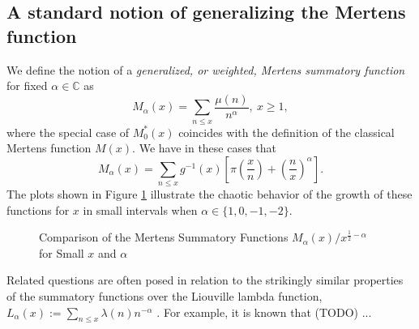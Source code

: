 \documentclass[11pt,reqno,a4letter]{article}
\numberwithin{figure}{section}
\numberwithin{table}{section}
\theoremstyle{plain}
\numberwithin{theorem}{section}
\theoremstyle{definition}
\begin{document}
\subsection{A standard notion of generalizing the Mertens function} 

We define the notion of a 
\emph{generalized, or weighted, Mertens summatory function} for fixed 
$\alpha \in \mathbb{C}$ as 
\begin{equation} 
\label{eqn_MAlphaAstx_WeightedClassicalMertensFuncs_def_v1} 
M_{\alpha}(x) = \sum_{n \leq x} \frac{\mu(n)}{n^{\alpha}},\ x \geq 1, 
\end{equation} 
where the special case of $M_0^{\ast}(x)$ 
coincides with the definition of the classical Mertens function $M(x)$. 
We have in these cases that 
\begin{equation} 
\label{eqn_} 
M_{\alpha}(x) = \sum_{n \leq x} g^{-1}(x) \left[\pi\left(\frac{x}{n}\right) + 
     \left(\frac{n}{x}\right)^{\alpha}\right]. 
\end{equation} 
The plots shown in Figure \ref{figure_MertensSummatoryFns_init_plots} 
illustrate the chaotic behavior of the growth of these 
functions for $x$ in small intervals when $\alpha \in \{1, 0, -1, -2\}$. 

\begin{figure}[ht!] 

\begin{minipage}{\textwidth} 
\begin{center}
\end{center} 
\end{minipage} 

\bigskip

\begin{minipage}{\textwidth} 
\begin{center}
\end{center}
\end{minipage} 

\caption{Comparison of the Mertens Summatory Functions $M_{\alpha}(x) / x^{\frac{1}{2}-\alpha}$ 
         for Small $x$ and $\alpha$} 
\label{figure_MertensSummatoryFns_init_plots} 

\end{figure} 

Related questions are often posed in relation to the strikingly 
similar properties of the 
summatory functions over the Liouville lambda function, 
$L_{\alpha}(x) := \sum_{n \leq x} \lambda(n) n^{-\alpha}$ 
\cite{TODO,TODO}. For example, it is known that (TODO) ... 
\end{document}
